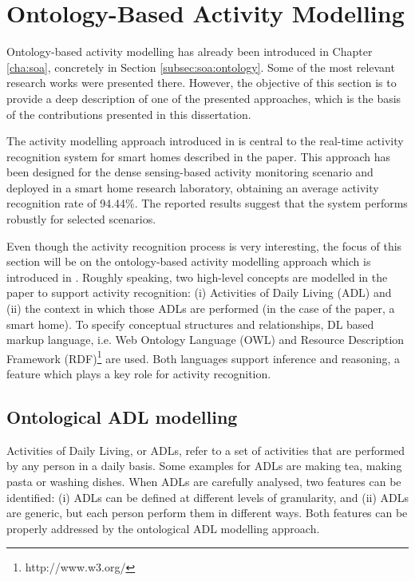 \section{Ontology-Based Activity Modelling}
\label{sec:approach:ontology}

Ontology-based activity modelling has already been introduced in Chapter \ref{cha:soa}, concretely in Section \ref{subsec:soa:ontology}. Some of the most relevant research works were presented there. However, the objective of this section is to provide a deep description of one of the presented approaches, which is the basis of the contributions presented in this dissertation.

The activity modelling approach introduced in \cite{Chen2012a} is central to the real-time activity recognition system for smart homes described in the paper. This approach has been designed for the dense sensing-based activity monitoring scenario and deployed in a smart home research laboratory, obtaining an average activity recognition rate of 94.44\%. The reported results suggest that the system performs robustly for selected scenarios.

Even though the activity recognition process is very interesting, the focus of this section will be on the ontology-based activity modelling approach which is introduced in \cite{Chen2012a}. Roughly speaking, two high-level concepts are modelled in the paper to support activity recognition: (i) Activities of Daily Living (ADL) and (ii) the context in which those ADLs are performed (in the case of the paper, a smart home). To specify conceptual structures and relationships, DL based markup language, i.e. Web Ontology Language (OWL) and Resource Description Framework (RDF)\footnote{http://www.w3.org/} are used. Both languages support inference and reasoning, a feature which plays a key role for activity recognition. 

\subsection{Ontological ADL modelling}
Activities of Daily Living, or ADLs, refer to a set of activities that are performed by any person in a daily basis. Some examples for ADLs are making tea, making pasta or washing dishes. When ADLs are carefully analysed, two features can be identified: (i) ADLs can be defined at different levels of granularity, and (ii) ADLs are generic, but each person perform them in different ways. Both features can be properly addressed by the ontological ADL modelling approach.

